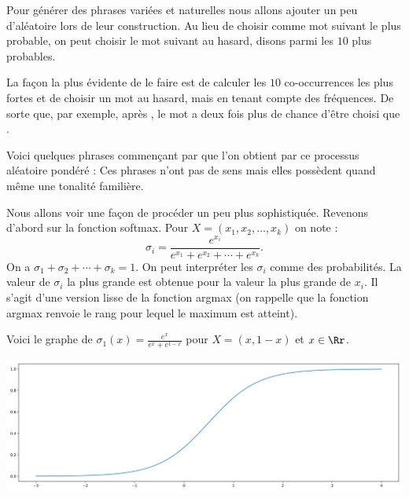 \documentclass[11pt,class=report,crop=false]{standalone}
\begin{document}
Pour générer des phrases variées et naturelles nous allons ajouter un peu d'aléatoire lors de leur construction. Au lieu de choisir comme mot suivant le plus probable, on peut choisir le mot suivant au hasard, disons parmi les $10$ plus probables.

La façon la plus évidente de le faire est de calculer les $10$ co-occurrences les plus fortes et de choisir un mot au hasard, mais en tenant compte des fréquences. De sorte que, par exemple, après , le mot  a deux fois plus de chance d'être choisi que .

Voici quelques phrases commençant par  que l'on obtient par ce processus aléatoire pondéré :
Ces phrases n'ont pas de sens mais elles possèdent quand même une tonalité familière.


\bigskip

Nous allons voir une façon de procéder un peu plus sophistiquée.
Revenons d'abord sur la fonction softmax.
Pour $X = (x_1,x_2,\ldots,x_k)$ on note :
$$\sigma_i  = \frac{e^{x_i}}{ e^{x_1} + e^{x_2} + \cdots + e^{x_k}}.$$
On a $\sigma_1 + \sigma_2 + \cdots + \sigma_k = 1$.
On peut interpréter les $\sigma_i$ comme des probabilités.
La valeur de $\sigma_i$ la plus grande est obtenue pour la valeur la plus grande de $x_i$. Il s'agit d'une version \og{}lisse\fg{} de la fonction argmax (on rappelle que la fonction argmax renvoie le rang pour lequel le maximum est atteint).

Voici le graphe de $\sigma_1(x) = \frac{e^x}{e^x+e^{1-x}}$ pour $X = (x,1-x)$ et $x \in \Rr$.
\begin{center}
	\includegraphics[scale=\myscale,scale=0.4]{figures/softmax-01}
\end{center}

\bigskip
\end{document}
